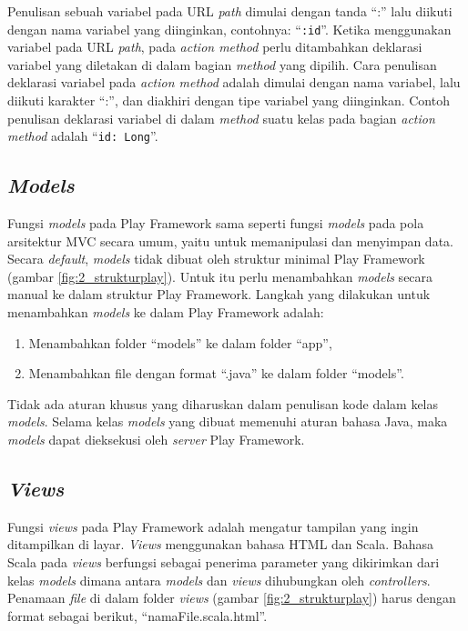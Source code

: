 Penulisan sebuah variabel pada URL \textit{path} dimulai dengan tanda ``:'' lalu diikuti dengan nama variabel yang diinginkan, contohnya: ``\texttt{:id}''. Ketika menggunakan variabel pada URL \textit{path}, pada \textit{action method} perlu ditambahkan deklarasi variabel yang diletakan di dalam bagian \textit{method} yang dipilih. Cara penulisan deklarasi variabel pada \textit{action method} adalah dimulai dengan nama variabel, lalu diikuti karakter ``:'', dan diakhiri dengan tipe variabel yang diinginkan. Contoh penulisan deklarasi variabel di dalam \textit{method} suatu kelas pada bagian \textit{action method} adalah ``\texttt{id: Long}''. 

\subsection{\textit{Models}}
\label{sec:models}
Fungsi \textit{models} pada Play Framework sama seperti fungsi \textit{models} pada pola arsitektur MVC secara umum, yaitu untuk memanipulasi dan menyimpan data. Secara \textit{default}, \textit{models} tidak dibuat oleh struktur minimal Play Framework (gambar \ref{fig:2_strukturplay}). Untuk itu perlu menambahkan \textit{models} secara manual ke dalam struktur Play Framework. Langkah yang dilakukan untuk menambahkan \textit{models} ke dalam Play Framework adalah:
\begin{enumerate}
	\item Menambahkan folder ``models'' ke dalam folder ``app'',
	\item Menambahkan file dengan format ``.java'' ke dalam folder ``models''.
\end{enumerate}

Tidak ada aturan khusus yang diharuskan dalam penulisan kode dalam kelas \textit{models}. Selama kelas \textit{models} yang dibuat memenuhi aturan bahasa Java, maka \textit{models} dapat dieksekusi oleh \textit{server} Play Framework.

\subsection{\textit{Views}}
\label{sec:views}
Fungsi \textit{views} pada Play Framework adalah mengatur tampilan yang ingin ditampilkan di layar. \textit{Views} menggunakan bahasa HTML dan Scala. Bahasa Scala pada \textit{views} berfungsi sebagai penerima parameter yang dikirimkan dari kelas \textit{models} dimana antara \textit{models} dan \textit{views} dihubungkan oleh \textit{controllers}. Penamaan \textit{file} di dalam folder \textit{views} (gambar \ref{fig:2_strukturplay}) harus dengan format sebagai berikut, ``namaFile.scala.html''.

